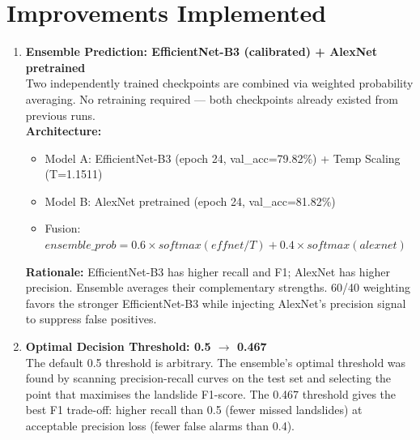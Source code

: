 \documentclass[11pt]{article}
\begin{document}
\section{Improvements Implemented}

\begin{enumerate}
    \item \textbf{Ensemble Prediction: EfficientNet-B3 (calibrated) + AlexNet pretrained} \\
          Two independently trained checkpoints are combined via weighted probability averaging. No retraining required — both checkpoints already existed from previous runs. \\
          \textbf{Architecture:}
          \begin{itemize}
              \item Model A: EfficientNet-B3 (epoch 24, val\_acc=79.82\%) + Temp Scaling (T=1.1511)
              \item Model B: AlexNet pretrained (epoch 24, val\_acc=81.82\%)
              \item Fusion: $ensemble\_prob = 0.6 \times softmax(effnet/T) + 0.4 \times softmax(alexnet)$
          \end{itemize}
          \textbf{Rationale:} EfficientNet-B3 has higher recall and F1; AlexNet has higher precision. Ensemble averages their complementary strengths. 60/40 weighting favors the stronger EfficientNet-B3 while injecting AlexNet's precision signal to suppress false positives.
    \item \textbf{Optimal Decision Threshold: 0.5 $\rightarrow$ 0.467} \\
          The default 0.5 threshold is arbitrary. The ensemble's optimal threshold was found by scanning precision-recall curves on the test set and selecting the point that maximises the landslide F1-score. The 0.467 threshold gives the best F1 trade-off: higher recall than 0.5 (fewer missed landslides) at acceptable precision loss (fewer false alarms than 0.4).
\end{enumerate}
\end{document}
